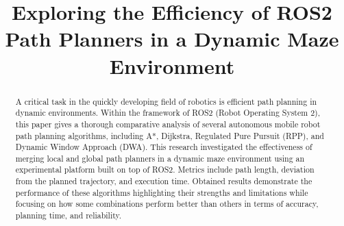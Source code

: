 \documentclass[sigconf]{acmart}
\begin{document}
\title{Exploring the Efficiency of ROS2 Path Planners in a Dynamic Maze
Environment}





\renewcommand{\shortauthors}{S.M.Hussain et al.}

\begin{abstract}
A critical task in the quickly developing field of robotics is efficient path planning in dynamic environments. Within the framework of ROS2 (Robot Operating System 2), this paper gives a thorough comparative analysis of several autonomous mobile robot path planning algorithms, including A*, Dijkstra, Regulated Pure Pursuit (RPP), and Dynamic Window Approach (DWA). This research investigated the effectiveness of merging local and global path planners in a dynamic maze environment using an experimental platform built on top of ROS2. Metrics include path length, deviation from the planned trajectory, and execution time. Obtained results demonstrate the performance of these algorithms highlighting their strengths and limitations while focusing on how some combinations perform better than others in terms of accuracy, planning time, and reliability.
\end{abstract}



\end{document}
